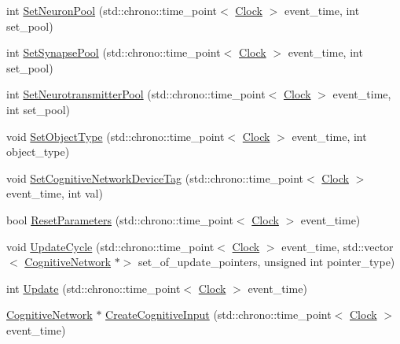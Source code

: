 \begin{DoxyCompactItemize}
\item 
int \hyperlink{class_cognitive_network_aeb59b511e2ef526c43df1d24a468b571}{Set\+Neuron\+Pool} (std\+::chrono\+::time\+\_\+point$<$ \hyperlink{universe_8h_a0ef8d951d1ca5ab3cfaf7ab4c7a6fd80}{Clock} $>$ event\+\_\+time, int set\+\_\+pool)
\item 
int \hyperlink{class_cognitive_network_a30f35d1bff2e1e3a5a2d921791cfe6b8}{Set\+Synapse\+Pool} (std\+::chrono\+::time\+\_\+point$<$ \hyperlink{universe_8h_a0ef8d951d1ca5ab3cfaf7ab4c7a6fd80}{Clock} $>$ event\+\_\+time, int set\+\_\+pool)
\item 
int \hyperlink{class_cognitive_network_aaa10c36c0b0024fa717d8d61a4a06920}{Set\+Neurotransmitter\+Pool} (std\+::chrono\+::time\+\_\+point$<$ \hyperlink{universe_8h_a0ef8d951d1ca5ab3cfaf7ab4c7a6fd80}{Clock} $>$ event\+\_\+time, int set\+\_\+pool)
\item 
void \hyperlink{class_cognitive_network_ad95a0b25c7f61fc52322938eb13c9e3e}{Set\+Object\+Type} (std\+::chrono\+::time\+\_\+point$<$ \hyperlink{universe_8h_a0ef8d951d1ca5ab3cfaf7ab4c7a6fd80}{Clock} $>$ event\+\_\+time, int object\+\_\+type)
\item 
void \hyperlink{class_cognitive_network_a0e8a64151a2446fc16a074ad2de325df}{Set\+Cognitive\+Network\+Device\+Tag} (std\+::chrono\+::time\+\_\+point$<$ \hyperlink{universe_8h_a0ef8d951d1ca5ab3cfaf7ab4c7a6fd80}{Clock} $>$ event\+\_\+time, int val)
\item 
bool \hyperlink{class_cognitive_network_a8af8ed2605263e57a32e457aba2af99d}{Reset\+Parameters} (std\+::chrono\+::time\+\_\+point$<$ \hyperlink{universe_8h_a0ef8d951d1ca5ab3cfaf7ab4c7a6fd80}{Clock} $>$ event\+\_\+time)
\item 
void \hyperlink{class_cognitive_network_aa37dda869174e4eef986cca4ce3e55d2}{Update\+Cycle} (std\+::chrono\+::time\+\_\+point$<$ \hyperlink{universe_8h_a0ef8d951d1ca5ab3cfaf7ab4c7a6fd80}{Clock} $>$ event\+\_\+time, std\+::vector$<$ \hyperlink{class_cognitive_network}{Cognitive\+Network} $\ast$$>$ set\+\_\+of\+\_\+update\+\_\+pointers, unsigned int pointer\+\_\+type)
\item 
int \hyperlink{class_cognitive_network_a05dccc7759456df13a732899a8f1f4c4}{Update} (std\+::chrono\+::time\+\_\+point$<$ \hyperlink{universe_8h_a0ef8d951d1ca5ab3cfaf7ab4c7a6fd80}{Clock} $>$ event\+\_\+time)
\item 
\hyperlink{class_cognitive_network}{Cognitive\+Network} $\ast$ \hyperlink{class_cognitive_network_add96197c3dc51d94d06edb480fbc4a38}{Create\+Cognitive\+Input} (std\+::chrono\+::time\+\_\+point$<$ \hyperlink{universe_8h_a0ef8d951d1ca5ab3cfaf7ab4c7a6fd80}{Clock} $>$ event\+\_\+time)
$$
\end{DoxyCompactItemize}
